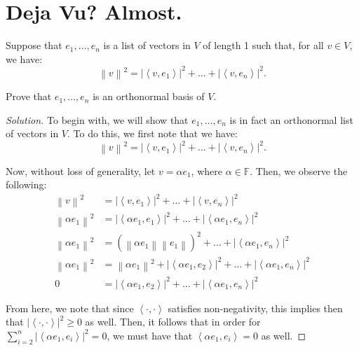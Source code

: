 \documentclass{article}
\newenvironment{solution}{\begin{proof}[Solution]}{\end{proof}}
\newcommand{\norm}[1]{\left\lVert{#1}\right\rVert}
\newcommand{\innerproduct}[2]{\left\langle{#1}, {#2}\right\rangle}
\begin{document}
	\section{Deja Vu? Almost.}
	\begin{hw}
		Suppose that $e_{1}, \ldots, e_{n}$ is a list of vectors in $V$ of length 1 such that, for all $v \in V$, we have:
		\begin{equation*}
			\norm{v}^{2} = \lvert \innerproduct{v}{e_{1}} \rvert^{2} + \ldots + \lvert \innerproduct{v}{e_{n}} \rvert^{2}. 
		\end{equation*}
	
		Prove that $e_{1}, \ldots, e_{n}$ is an orthonormal basis of $V$.
	\end{hw}
	\begin{solution}
		To begin with, we will show that $e_{1}, \ldots, e_{n}$ is in fact an orthonormal list of vectors in $V$. To do this, we first note that we have:
		\begin{equation*}
			\norm{v}^{2} = \lvert \innerproduct{v}{e_{1}} \rvert^{2} + \ldots + \lvert \innerproduct{v}{e_{n}} \rvert^{2}.
		\end{equation*}
	
		Now, without loss of generality, let $v = \alpha e_{1}$, where $\alpha \in \mathbb{F}$. Then, we observe the following:
		\begin{align*}
			\norm{v}^{2} &= \lvert \innerproduct{v}{e_{1}} \rvert^{2} + \ldots + \lvert \innerproduct{v}{e_{n}} \rvert^{2} \\
			\norm{\alpha e_{1}}^{2} &= \lvert \innerproduct{\alpha e_{1}}{e_{1}} \rvert^{2} + \ldots + \lvert \innerproduct{\alpha e_{1}}{e_{n}} \rvert^{2} \\
			\norm{\alpha e_{1}}^{2} &= \left( \norm{\alpha e_{1}} \norm{e_{1}} \right)^{2} + \ldots + \lvert \innerproduct{\alpha e_{1}}{e_{n}} \rvert^{2} \tag{Cauchy-Schwarz Inequality} \\
			\norm{\alpha e_{1}}^{2} &= \norm{\alpha e_{1}}^{2} + \lvert \innerproduct{\alpha e_{1}}{e_{2}} \rvert^{2} + \ldots + \lvert \innerproduct{\alpha e_{1}}{e_{n}} \rvert^{2} \\
			0 &= \lvert \innerproduct{\alpha e_{1}}{e_{2}} \rvert^{2} + \ldots + \lvert \innerproduct{\alpha e_{1}}{e_{n}} \rvert^{2}
		\end{align*}
	
		From here, we note that since $\innerproduct{\cdot}{\cdot}$ satisfies non-negativity, this implies then that $\lvert \innerproduct{\cdot}{\cdot} \rvert^{2} \geq 0$ as well. Then, it follows that in order for $\sum_{i=2}^{n} \lvert \innerproduct{\alpha e_{1}}{e_{i}} \rvert^{2} = 0$, we must have that $\innerproduct{\alpha e_{1}}{e_{i}} = 0$ as well.
		

\end{solution}
\end{document}
